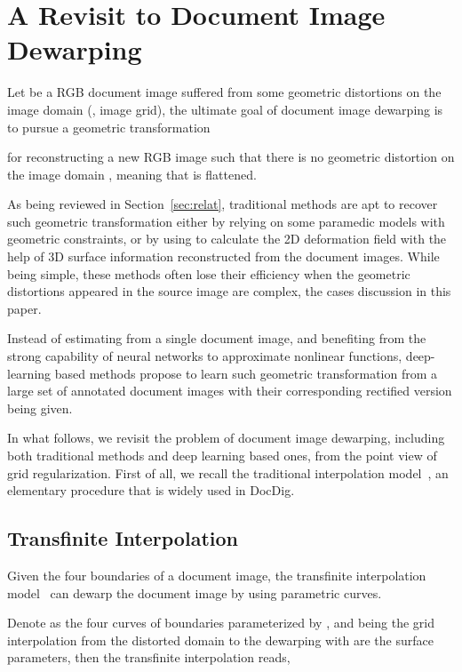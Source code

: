 \documentclass[10pt,twocolumn,letterpaper]{article}
\begin{document}
\section{A Revisit to Document Image Dewarping}

Let  be a RGB document image suffered from some geometric distortions on the image domain  (\ie, image grid), the ultimate goal of document image dewarping is to pursue a geometric transformation 
 
for reconstructing a new RGB image  such that there is no geometric distortion on the image domain , meaning that  is flattened.

As being reviewed in Section~\ref{sec:relat}, traditional methods are apt to recover such geometric transformation  either by relying on some paramedic models with geometric constraints, or by using to calculate the 2D deformation field with the help of 3D surface information reconstructed from the document images. While being simple, these methods often lose their efficiency when the geometric distortions appeared in the source image  are complex, \eg the cases discussion in this paper.

Instead of estimating  from a single document image, and benefiting from the strong capability of neural networks to approximate nonlinear functions, deep-learning based methods propose to learn such geometric transformation  from a large set of annotated document images with their corresponding rectified version being given.   

In what follows, we revisit the problem of document image dewarping, including both traditional methods and deep learning based ones, from the point view of grid regularization.
First of all, we recall the traditional interpolation model~\cite{tsoi2007multi}, an elementary procedure that is widely used in DocDig.  
\vspace{-0.5em}

\subsection{Transfinite Interpolation} 
 
Given the four boundaries of a document image, the transfinite interpolation model~\cite{tsoi2007multi} can dewarp the document image by using parametric curves.
 

Denote  as the four curves of boundaries parameterized by , 
and  being the grid interpolation from the distorted domain  to the dewarping  with  are the surface parameters, then the transfinite interpolation reads,
\end{document}
